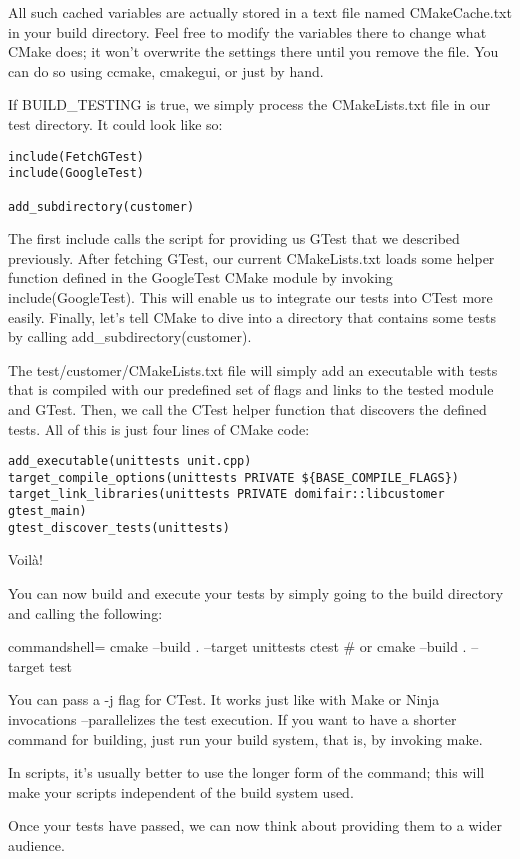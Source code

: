 All such cached variables are actually stored in a text file named CMakeCache.txt in your build directory. Feel free to modify the variables there to change what CMake does; it won't overwrite the settings there until you remove the file. You can do so using ccmake, cmakegui, or just by hand.

If BUILD\_TESTING is true, we simply process the CMakeLists.txt file in our test directory. It could look like so:

\begin{lstlisting}[style=styleCMake]
include(FetchGTest)
include(GoogleTest)

add_subdirectory(customer)
\end{lstlisting}

The first include calls the script for providing us GTest that we described previously. After fetching GTest, our current CMakeLists.txt loads some helper function defined in the GoogleTest CMake module by invoking include(GoogleTest). This will enable us to integrate our tests into CTest more easily. Finally, let's  tell CMake to dive into a directory that contains some tests by calling  add\_subdirectory(customer).

The test/customer/CMakeLists.txt file will simply add an executable with tests that is compiled with our predefined set of flags and links to the tested module and GTest. Then, we call the CTest helper function that discovers the defined tests. All of this is just four lines of CMake code:

\begin{lstlisting}[style=styleCMake]
add_executable(unittests unit.cpp)
target_compile_options(unittests PRIVATE ${BASE_COMPILE_FLAGS})
target_link_libraries(unittests PRIVATE domifair::libcustomer gtest_main)
gtest_discover_tests(unittests)
\end{lstlisting}

Voilà!

You can now build and execute your tests by simply going to the build directory and calling the following:

\begin{tcblisting}{commandshell={}}
cmake --build . --target unittests
ctest # or cmake --build . --target test
\end{tcblisting}

You can pass a -j flag for CTest. It works just like with Make or Ninja invocations –parallelizes the test execution. If you want to have a shorter command for building, just run your build system, that is, by invoking make.

\begin{tcolorbox}[colback=blue!5!white,colframe=blue!75!black, title=Note]
\hspace*{0.7cm}In scripts, it's usually better to use the longer form of the command; this will make your scripts independent of the build system used.
\end{tcolorbox}

Once your tests have passed, we can now think about providing them to a wider audience.






